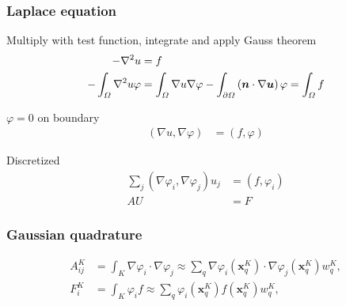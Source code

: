 




\begin{frame}
\frametitle{Laplace equation}

Multiply with test function, integrate and apply Gauss theorem
\begin{align*}
- \nabla^2 u &= f \\
- \int_\Omega \nabla^2 u \varphi &= \int_\Omega \nabla u \nabla \varphi - \int_{\partial\Omega} \left(\vectorsym{n} \cdot \nabla\vectorsym{u}\right) \varphi = \int_\Omega f
\end{align*}

$\varphi = 0$ on boundary
\begin{align*}
(\nabla u, \nabla \varphi) &= (f,\varphi)
\end{align*}

Discretized
\begin{align*}
\sum_j \left(\nabla\varphi_i, \nabla \varphi_j \right) u_j &= (f,\varphi_i) \\
AU &= F
\end{align*}
\end{frame}










\begin{frame}
\frametitle{Gaussian quadrature}
  
\begin{align*}
  A^K_{ij} &= \int_K \nabla\varphi_i \cdot \nabla \varphi_j \approx \sum_q \nabla\varphi_i(\mathbf x^K_q) \cdot \nabla \varphi_j(\mathbf x^K_q) w_q^K, \\
  F^K_i &= \int_K \varphi_i f \approx \sum_q \varphi_i(\mathbf x^K_q) f(\mathbf x^K_q) w^K_q,
\end{align*}
\end{frame}